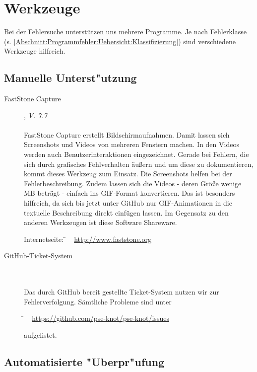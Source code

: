 %



\section{Werkzeuge}
\label{Abschnitt:Programmfehler:Werkzeuge}

Bei der Fehlersuche unterstützen uns mehrere Programme.
Je nach Fehlerklasse (s. \ref{Abschnitt:Programmfehler:Uebersicht:Klassifizierung}) sind verschiedene Werkzeuge hilfreich.





\subsection{Manuelle Unterst{"u}tzung}
\label{Abschnitt:Programmfehler:Werkzeuge:Manuell}


\begin{description}

	\item[FastStone Capture], \textit{V. 7.7}\hfill
		\\
		\\
		FastStone Capture erstellt Bildschirmaufnahmen. Damit lassen sich Screenshots und Videos von mehreren Fenstern machen. In den Videos werden auch Benutzerinteraktionen eingezeichnet. Gerade bei Fehlern, die sich durch grafisches Fehlverhalten äußern und um diese zu dokumentieren, kommt dieses Werkzeug zum Einsatz. Die Screenshots helfen bei der Fehlerbeschreibung. Zudem lassen sich die Videos - deren Größe wenige MB beträgt - einfach ins GIF-Format konvertieren. Das ist besonders hilfreich, da sich bis jetzt unter GitHub nur GIF-Animationen in die textuelle Beschreibung direkt einfügen lassen. Im Gegensatz zu den anderen Werkzeugen ist diese Software Shareware.
		
		\begin{tabbing}
			Internetseite:
			\= ~ \href {http://www.faststone.org}
		    	       {http://www.faststone.org}
		    \\
		\end{tabbing}
		
		\item[GitHub-Ticket-System] \hfill
		\\
		\\
		Das durch GitHub bereit gestellte Ticket-System nutzen wir zur Fehlerverfolgung. Sämtliche Probleme sind unter
		
		\begin{tabbing}
				\= ~ \href {https://github.com/pse-knot/pse-knot/issues}
    	       			   {https://github.com/pse-knot/pse-knot/issues}
    	       			   
		\end{tabbing} aufgelistet.
		

\end{description}




\subsection{Automatisierte {"U}berpr{"u}fung}
\label{Abschnitt:Programmfehler:Werkzeuge:Automatisiert}







